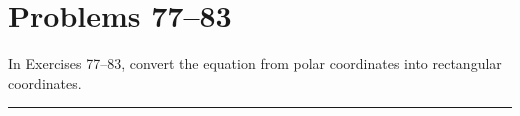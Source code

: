\section{Problems 77--83}

In Exercises 77--83, convert the equation from polar coordinates into rectangular coordinates. \medskip

\hrule